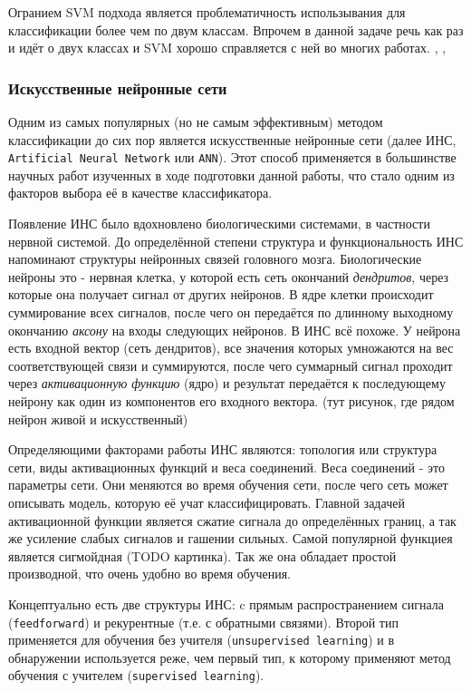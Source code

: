 \documentclass[12pt]{report}
\begin{document}
Огранием SVM подхода является проблематичность использывания для классификации более чем по двум классам. Впрочем в данной задаче речь как раз и идёт о двух классах и SVM хорошо справляется с ней во многих работах. \citep{shavers2006svm}, \citep{jee2004eye}, \citep{saxena2008real}
\subsubsection{Искусственные нейронные сети}
Одним из самых популярных (но не самым эффективным) методом классификации до сих пор является искусственные нейронные сети (далее ИНС, \texttt{Artificial Neural Network} или \texttt{ANN}). Этот способ применяется в большинстве научных работ изученных в ходе подготовки данной работы, что стало одним из факторов выбора её в качестве классификатора. 

Появление ИНС было вдохновлено биологическими системами, в частности нервной системой. До определённой степени структура и функциональность ИНС напоминают структуры нейронных связей головного мозга. Биологические нейроны это - нервная клетка, у которой есть сеть окончаний \emph{дендритов}, через которые она получает сигнал от других нейронов. В ядре клетки происходит суммирование всех сигналов, после чего он передаётся по длинному выходному окончанию \emph{аксону} на входы следующих нейронов. В ИНС всё похоже. У нейрона есть входной вектор (сеть дендритов), все значения которых умножаются на вес соответствующей связи и суммируются, после чего суммарный сигнал проходит через \emph{активационную функцию} (ядро) и результат передаётся к последующему нейрону как один из компонентов его входного вектора. (тут рисунок, где рядом нейрон живой и искусственный)

Определяющими факторами работы ИНС являются: топология или структура сети, виды активационных функций и веса соединений. Веса соединений - это параметры сети. Они меняются во время обучения сети, после чего сеть может описывать модель, которую её учат классифицировать. Главной задачей активационной функции является сжатие сигнала до определённых границ, а так же усиление слабых сигналов и гашении сильных. Самой популярной функциея является сигмойдная (TODO картинка). Так же она обладает простой производной, что очень удобно во время обучения.

Концептуально есть две структуры ИНС: c прямым распространением сигнала (\texttt{feedforward}) и рекурентные (т.е. с обратными связями). Второй тип применяется для обучения без учителя (\texttt{unsupervised learning}) и в обнаружении используется реже, чем первый тип, к которому применяют метод обучения с учителем (\texttt{supervised learning}). 
\end{document}
